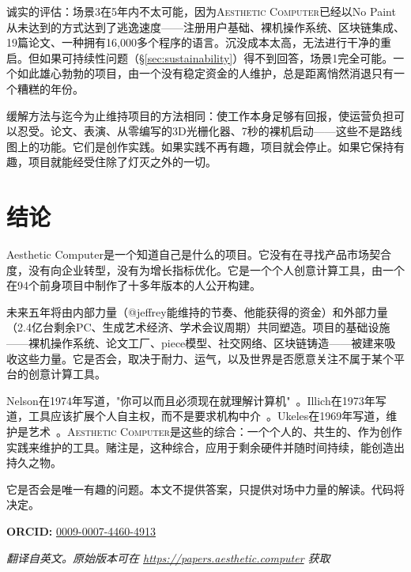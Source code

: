 \documentclass[10pt,letterpaper,twocolumn]{article}
\newcommand{\ac}{\textsc{Aesthetic Computer}}
\begin{document}
诚实的评估：场景3在5年内不太可能，因为\ac{}已经以No Paint从未达到的方式达到了逃逸速度——注册用户基础、裸机操作系统、区块链集成、19篇论文、一种拥有16,000多个程序的语言。沉没成本太高，无法进行干净的重启。但如果可持续性问题（\S\ref{sec:sustainability}）得不到回答，场景1完全可能。一个如此雄心勃勃的项目，由一个没有稳定资金的人维护，总是距离悄然消退只有一个糟糕的年份。

缓解方法与迄今为止维持项目的方法相同：使工作本身足够有回报，使运营负担可以忍受。论文、表演、从零编写的3D光栅化器、7秒的裸机启动——这些不是路线图上的功能。它们是创作实践。如果实践不再有趣，项目就会停止。如果它保持有趣，项目就能经受住除了灯灭之外的一切。


\section{结论}

Aesthetic Computer是一个知道自己是什么的项目。它没有在寻找产品市场契合度，没有向企业转型，没有为增长指标优化。它是一个个人创意计算工具，由一个在94个前身项目中制作了十多年版本的人公开构建。

未来五年将由内部力量（@jeffrey能维持的节奏、他能获得的资金）和外部力量（2.4亿台剩余PC、生成艺术经济、学术会议周期）共同塑造。项目的基础设施——裸机操作系统、论文工厂、piece模型、社交网络、区块链铸造——被建来吸收这些力量。它是否会，取决于耐力、运气，以及世界是否愿意关注不属于某个平台的创意计算工具。

Nelson在1974年写道，"你可以而且必须现在就理解计算机"~\citep{nelson1974computerlib}。Illich在1973年写道，工具应该扩展个人自主权，而不是要求机构中介~\citep{illich1973tools}。Ukeles在1969年写道，维护是艺术~\citep{ukeles1969manifesto}。\ac{}是这些的综合：一个个人的、共生的、作为创作实践来维护的工具。赌注是，这种综合，应用于剩余硬件并随时间持续，能创造出持久之物。

它是否会是唯一有趣的问题。本文不提供答案，只提供对场中力量的解读。代码将决定。

\vspace{0.5em}
\noindent\textbf{ORCID:} \href{https://orcid.org/0009-0007-4460-4913}{0009-0007-4460-4913}

\vspace{0.5em}\noindent\textit{翻译自英文。原始版本可在 \url{https://papers.aesthetic.computer} 获取}




\end{document}
